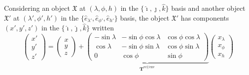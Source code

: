 \documentclass[11pt,dvipsnames]{thesis}
\begin{document}
Considering an object $\mathfrak{X}$ at $(\lambda, \phi, h)$ in the $\{\hat{\imath}, \hat{\jmath}, \hat{k}\}$ basis and another object $\mathfrak{X}'$ at $(\lambda', \phi', h')$ in the $\{\hat{e}_{\lambda'}, \hat{e}_{\phi'}, \hat{e}_{h'}\}$ basis, the object $\mathfrak{X}'$ has components $(x', y', z')$ in the $\{\hat{\imath}, \hat{\jmath}, \hat{k}\}$ written
\begin{equation}
\begin{pmatrix}x' \\ y' \\ z'\end{pmatrix} = \begin{pmatrix}x \\ y \\ z\end{pmatrix} + \underbrace{\begin{pmatrix}-\sin\lambda & -\sin\phi\cos\lambda & \cos\phi\cos\lambda \\ \cos\lambda & -\sin\phi\sin\lambda & \cos\phi\sin\lambda \\ 0 & \cos\phi & \sin\phi\end{pmatrix}}_{\mathbf{T}^{\text{ecf}/\text{env}}} \begin{pmatrix}x_\lambda \\ x_\phi \\ x_h\end{pmatrix}
\end{equation}
\end{document}
